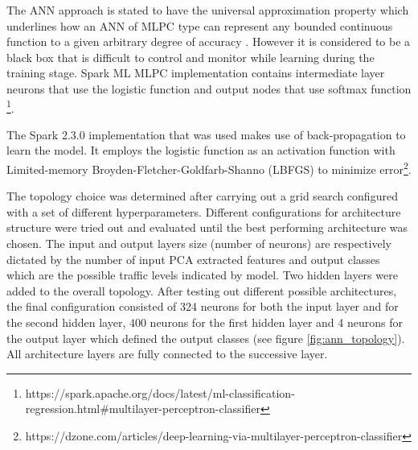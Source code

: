 \documentclass[12pt, a4paper]{report}
\theoremstyle{definition}
\theoremstyle{definition}%
\theoremstyle{definition}%
\theoremstyle{definition}%
\theoremstyle{definition}%
\theoremstyle{definition}%
\begin{document}
The ANN approach is stated to have the universal approximation property which underlines how an ANN of MLPC type can represent any bounded continuous function to a given arbitrary degree of accuracy \cite{hornik1990universal}. However it is considered to be a black box that is difficult to control and monitor while learning during the training stage. Spark ML MLPC implementation contains intermediate layer neurons that use the logistic function and output nodes that use softmax function \footnote{https://spark.apache.org/docs/latest/ml-classification-regression.html\#multilayer-perceptron-classifier}.

The Spark 2.3.0 implementation that was used makes use of back-propagation to learn the model. It employs the logistic function as an activation function with Limited-memory Broyden-Fletcher-Goldfarb-Shanno (LBFGS) to minimize error\footnote{https://dzone.com/articles/deep-learning-via-multilayer-perceptron-classifier}.  


The topology choice was determined after carrying out a grid search configured with a set of different hyperparameters. Different configurations for architecture structure were tried out and evaluated until the best performing architecture was chosen. The input and output layers size (number of neurons) are respectively dictated by the number of input PCA extracted features and output classes which are the possible traffic levels indicated by model. Two hidden layers were added to the overall topology. After testing out different possible architectures, the final configuration consisted of 324 neurons for both the input layer and for the second hidden layer, 400 neurons for the first hidden layer and 4 neurons for the output layer which defined the output classes (see figure \ref{fig:ann_topology}). All architecture layers are fully connected to the successive layer. 
\end{document}
